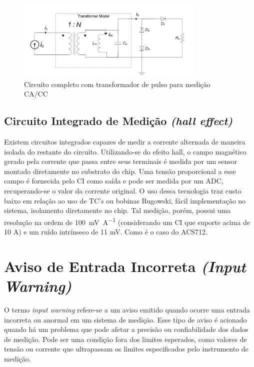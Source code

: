 \begin{figure}[htb]
    \caption{Circuito completo com transformador de pulso para medição \gls{CA}/\gls{CC}}
    \label{fig:circuito-tc-dc}
    \includegraphics[width=0.8\textwidth]{figuras/transform-corrente-dc.png}
\end{figure}

\subsection{Circuito Integrado de Medição \textit{(hall effect)}}\label{subsec:halleffect}

Existem circuitos integrados capazes de medir a corrente alternada de maneira isolada do
restante do circuito. Utilizando-se do efeito hall, o campo magnético gerado pela corrente
que passa entre seus terminais é medida por um sensor montado diretamente no substrato
do chip. Uma tensão proporcional a esse campo é fornecida pelo CI como saída e pode ser
medida por um ADC, recuperando-se o valor da corrente original.
O uso dessa tecnologia traz custo baixo em relação ao uso de TC's ou bobinas Rugowski,
fácil implementação no sistema, isolamento diretamente no chip.
Tal medição, porém, possui uma resolução na ordem de \SI{100}{\milli\volt\per\ampere} (considerando um CI que suporte acima de 10 A) e um ruído intrínseco de 11 mV. Como é o caso do ACS712.\citep{acs712}

\section{Aviso de Entrada Incorreta \textit{(Input Warning)}}\label{sec:inpWarning}

O termo \textit{input warning} refere-se a um aviso emitido quando ocorre uma entrada incorreta ou anormal em um sistema de medição. Esse tipo de aviso é acionado quando há um problema que pode afetar a precisão ou confiabilidade dos dados de medição. Pode ser uma condição fora dos limites esperados, como valores de tensão ou corrente que ultrapassam os limites especificados pelo instrumento de medição. \cite{base_alarms}

